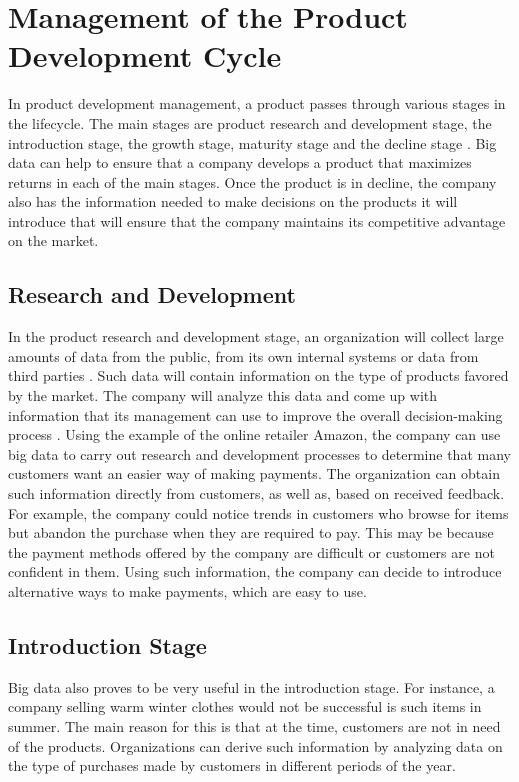 \documentclass[sigconf]{acmart}
\begin{document}
\section{Management of the Product Development Cycle}
In product development management, a product passes through various stages in the lifecycle. The main stages are product research and development stage, the introduction stage, the growth stage, maturity stage and the decline stage \cite{Stark2015}. Big data can help to ensure that a company develops a product that maximizes returns in each of the main stages. Once the product is in decline, the company also has the information needed to make decisions on the products it will introduce that will ensure that the company maintains its competitive advantage on the market. 
\subsection{Research and Development}
In the product research and development stage, an organization will collect large amounts of data from the public, from its own internal systems or data from third parties \cite{Ron2016}. Such data will contain information on the type of products favored by the market. The company will analyze this data and come up with information that its management can use to improve the overall decision-making process \cite{Ron2016}. 
Using the example of the online retailer Amazon, the company can use big data to carry out research and development processes to determine that many customers want an easier way of making payments. The organization can obtain such information directly from customers, as well as, based on received feedback. For example, the company could notice trends in customers who browse for items but abandon the purchase when they are required to pay. This may be because the payment methods offered by the company are difficult or customers are not confident in them. Using such information, the company can decide to introduce alternative ways to make payments, which are easy to use.
\subsection{Introduction Stage}
Big data also proves to be very useful in the introduction stage. For instance, a company selling warm winter clothes would not be successful is such items in summer. The main reason for this is that at the time, customers are not in need of the products. Organizations can derive such information by analyzing data on the type of purchases made by customers in different periods of the year.
\end{document}
